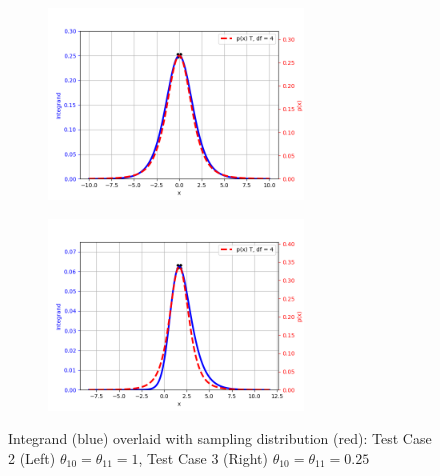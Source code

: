 \begin{figure}[!htb]
\begin{center}
\begin{subfigure}%
    \centering
    \includegraphics[height=2in]{Chap6_EvaluationAndAnalysis/images/px_D_1_1_1_1_N_3_3.png}
\end{subfigure}
\begin{subfigure}%
    \centering
    \includegraphics[height=2in]{Chap6_EvaluationAndAnalysis/images/px_D_1_1_025_025_N_3_3.png}
\end{subfigure}
\caption{Integrand (blue) overlaid with sampling distribution (red): Test Case 2 (Left) \(\theta_{10}=\theta_{11}=1\), Test Case 3 (Right) \(\theta_{10}=\theta_{11}=0.25\)}
\label{fig:sampling_pdfs_model}
\end{center}
\end{figure}

